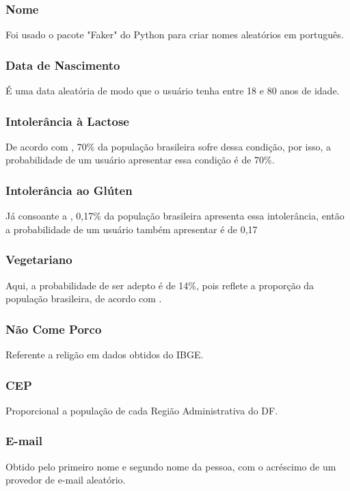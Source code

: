 \documentclass[conference,compsoc]{IEEEtran}
\begin{document}
\subsubsection{Nome}
Foi usado o pacote "Faker" do Python para criar nomes aleatórios em português.

\subsubsection{Data de Nascimento}
É uma data aleatória de modo que o usuário tenha entre 18 e 80 anos de idade.

\subsubsection{Intolerância à Lactose}
De acordo com \cite{LACTOSE}, 70\% da população brasileira sofre dessa condição, por isso, a probabilidade de um usuário apresentar essa condição é de 70\%.

\subsubsection{Intolerância ao Glúten}
Já consoante a \cite{GLUTEN}, 0,17\% da população brasileira apresenta essa intolerância, então a probabilidade de um usuário também apresentar é de 0,17%

\subsubsection{Vegetariano}
Aqui, a probabilidade de ser adepto é de 14\%, pois reflete a proporção da população brasileira, de acordo com \cite{VEGETARIANO}.

\subsubsection{Não Come Porco}
Referente a religão em dados obtidos do IBGE.

\subsubsection{CEP}
Proporcional a população de cada Região Administrativa do DF.

\subsubsection{E-mail}
Obtido pelo primeiro nome e segundo nome da pessoa, com o acréscimo de um provedor de e-mail aleatório.
\end{document}
